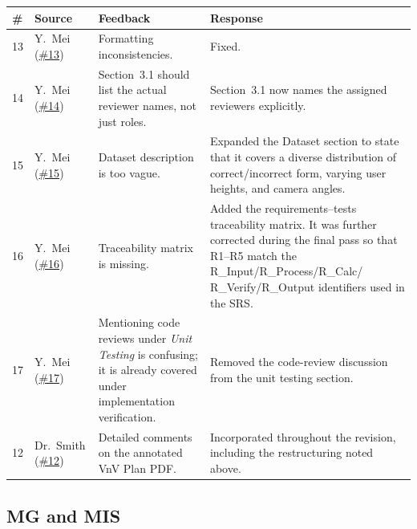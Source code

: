 \documentclass{article}
\begin{document}
\begin{longtable}{p{} p{} p{} p{}}
\toprule
\textbf{\#} & \textbf{Source} & \textbf{Feedback} & \textbf{Response}\\
\midrule
\endhead
13 & Y.~Mei (\href{https://github.com/mmdmirh/cas741/issues/13}{\#13}) &
Formatting inconsistencies. & Fixed.\\
14 & Y.~Mei (\href{https://github.com/mmdmirh/cas741/issues/14}{\#14}) &
Section~3.1 should list the actual reviewer names, not just roles. &
Section~3.1 now names the assigned reviewers explicitly.\\
15 & Y.~Mei (\href{https://github.com/mmdmirh/cas741/issues/15}{\#15}) &
Dataset description is too vague. &
Expanded the Dataset section to state that it covers a diverse distribution
of correct/incorrect form, varying user heights, and camera angles.\\
16 & Y.~Mei (\href{https://github.com/mmdmirh/cas741/issues/16}{\#16}) &
Traceability matrix is missing. &
Added the requirements--tests traceability matrix. It was further corrected
during the final pass so that R1--R5 match the R\_Input/R\_Process/R\_Calc/
R\_Verify/R\_Output identifiers used in the SRS.\\
17 & Y.~Mei (\href{https://github.com/mmdmirh/cas741/issues/17}{\#17}) &
Mentioning code reviews under \emph{Unit Testing} is confusing; it is already
covered under implementation verification. &
Removed the code-review discussion from the unit testing section.\\
12 & Dr.~Smith (\href{https://github.com/mmdmirh/cas741/issues/12}{\#12}) &
Detailed comments on the annotated VnV Plan PDF. &
Incorporated throughout the revision, including the restructuring noted
above.\\
\bottomrule
\end{longtable}

\subsection{MG and MIS}
\end{document}
